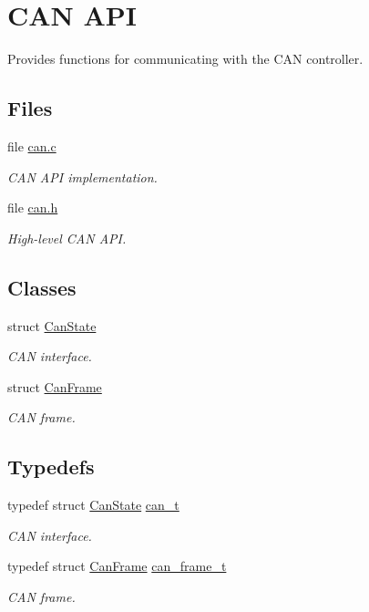 \hypertarget{group___c_a_n}{\section{C\-A\-N A\-P\-I}
\label{group___c_a_n}
}


Provides functions for communicating with the C\-A\-N controller.  


\subsection*{Files}
\begin{DoxyCompactItemize}
\item 
file \hyperlink{can_8c}{can.\-c}
\begin{DoxyCompactList}\small\item\em C\-A\-N A\-P\-I implementation. \end{DoxyCompactList}\item 
file \hyperlink{can_8h}{can.\-h}
\begin{DoxyCompactList}\small\item\em High-\/level C\-A\-N A\-P\-I. \end{DoxyCompactList}\end{DoxyCompactItemize}
\subsection*{Classes}
\begin{DoxyCompactItemize}
\item 
struct \hyperlink{struct_can_state}{Can\-State}
\begin{DoxyCompactList}\small\item\em C\-A\-N interface. \end{DoxyCompactList}\item 
struct \hyperlink{struct_can_frame}{Can\-Frame}
\begin{DoxyCompactList}\small\item\em C\-A\-N frame. \end{DoxyCompactList}\end{DoxyCompactItemize}
\subsection*{Typedefs}
\begin{DoxyCompactItemize}
\item 
typedef struct \hyperlink{struct_can_state}{Can\-State} \hyperlink{group___c_a_n_ga9c929a51dc60dc74c97e7f3c4bb76300}{can\-\_\-t}
\begin{DoxyCompactList}\small\item\em C\-A\-N interface. \end{DoxyCompactList}\item 
typedef struct \hyperlink{struct_can_frame}{Can\-Frame} \hyperlink{group___c_a_n_ga78ee122f82484a1d73d82b66b1000d64}{can\-\_\-frame\-\_\-t}
\begin{DoxyCompactList}\small\item\em C\-A\-N frame. \end{DoxyCompactList}\end{DoxyCompactItemize}
